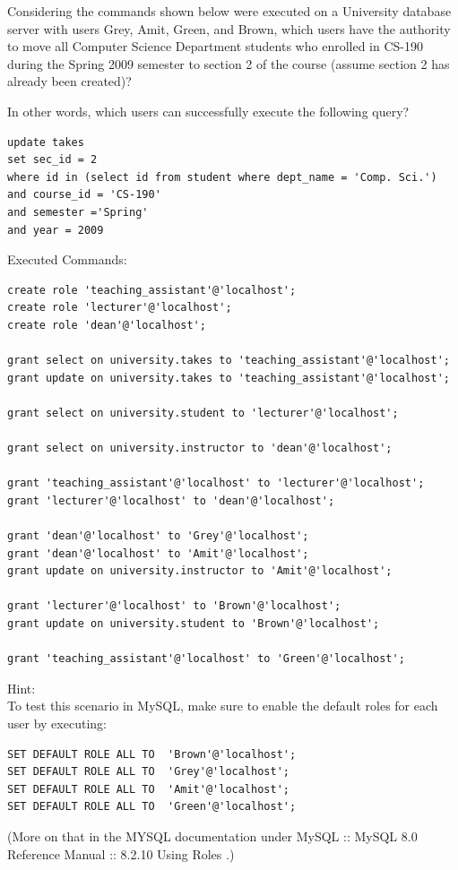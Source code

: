 \documentclass[12pt]{exam}
\begin{document}
\begin{questions}
\begin{samepage}
\question[4]
Considering the commands shown below were executed on a University database server with users Grey, Amit, Green, and Brown,
which users have the authority to move all Computer Science Department students who enrolled in CS-190 during the Spring 2009 
semester to section 2 of the course (assume section 2 has already been created)?\par\vspace{0.5em}
In other words, which users can successfully execute the following query?\par\vspace{0.5em}
\begin{verbatim}
update takes
set sec_id = 2
where id in (select id from student where dept_name = 'Comp. Sci.')
and course_id = 'CS-190'
and semester ='Spring'
and year = 2009
\end{verbatim}
Executed Commands:\par\vspace{0.5em}
\begin{verbatim}
create role 'teaching_assistant'@'localhost';
create role 'lecturer'@'localhost';
create role 'dean'@'localhost';

grant select on university.takes to 'teaching_assistant'@'localhost';
grant update on university.takes to 'teaching_assistant'@'localhost';

grant select on university.student to 'lecturer'@'localhost';

grant select on university.instructor to 'dean'@'localhost';

grant 'teaching_assistant'@'localhost' to 'lecturer'@'localhost';
grant 'lecturer'@'localhost' to 'dean'@'localhost';

grant 'dean'@'localhost' to 'Grey'@'localhost';
grant 'dean'@'localhost' to 'Amit'@'localhost';
grant update on university.instructor to 'Amit'@'localhost';

grant 'lecturer'@'localhost' to 'Brown'@'localhost';
grant update on university.student to 'Brown'@'localhost';

grant 'teaching_assistant'@'localhost' to 'Green'@'localhost';
\end{verbatim}

Hint: \\
To test this scenario in MySQL, make sure to enable the default roles for each user by executing:\par\vspace{0.5em}
\begin{verbatim}
SET DEFAULT ROLE ALL TO  'Brown'@'localhost';
SET DEFAULT ROLE ALL TO  'Grey'@'localhost';
SET DEFAULT ROLE ALL TO  'Amit'@'localhost';
SET DEFAULT ROLE ALL TO  'Green'@'localhost';
\end{verbatim}
(More on that in the MYSQL documentation under MySQL :: MySQL 8.0 Reference Manual :: 8.2.10 Using Roles .)


\end{samepage}
\end{questions}
\end{document}
